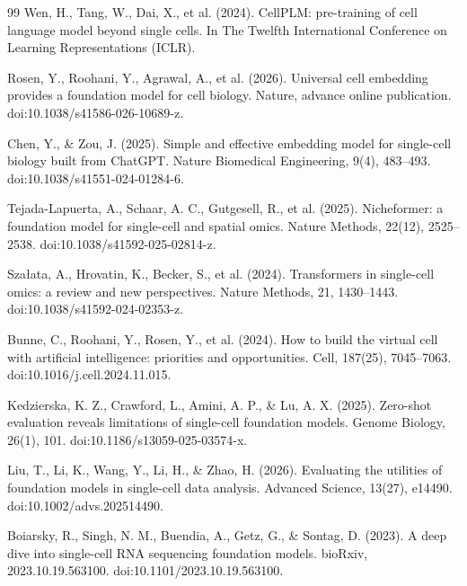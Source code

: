 \documentclass[11pt,a4paper]{article}
\begin{document}
\begin{thebibliography}{99}
Wen, H., Tang, W., Dai, X., et al. (2024).
\newblock CellPLM: pre-training of cell language model beyond single cells.
\newblock In The Twelfth International Conference on Learning Representations (ICLR).

Rosen, Y., Roohani, Y., Agrawal, A., et al. (2026).
\newblock Universal cell embedding provides a foundation model for cell biology.
\newblock Nature, advance online publication. doi:10.1038/s41586-026-10689-z.

Chen, Y., \& Zou, J. (2025).
\newblock Simple and effective embedding model for single-cell biology built from ChatGPT.
\newblock Nature Biomedical Engineering, 9(4), 483--493. doi:10.1038/s41551-024-01284-6.

Tejada-Lapuerta, A., Schaar, A. C., Gutgesell, R., et al. (2025).
\newblock Nicheformer: a foundation model for single-cell and spatial omics.
\newblock Nature Methods, 22(12), 2525--2538. doi:10.1038/s41592-025-02814-z.

Sza{\l}ata, A., Hrovatin, K., Becker, S., et al. (2024).
\newblock Transformers in single-cell omics: a review and new perspectives.
\newblock Nature Methods, 21, 1430--1443. doi:10.1038/s41592-024-02353-z.

Bunne, C., Roohani, Y., Rosen, Y., et al. (2024).
\newblock How to build the virtual cell with artificial intelligence: priorities and opportunities.
\newblock Cell, 187(25), 7045--7063. doi:10.1016/j.cell.2024.11.015.

Kedzierska, K. Z., Crawford, L., Amini, A. P., \& Lu, A. X. (2025).
\newblock Zero-shot evaluation reveals limitations of single-cell foundation models.
\newblock Genome Biology, 26(1), 101. doi:10.1186/s13059-025-03574-x.

Liu, T., Li, K., Wang, Y., Li, H., \& Zhao, H. (2026).
\newblock Evaluating the utilities of foundation models in single-cell data analysis.
\newblock Advanced Science, 13(27), e14490. doi:10.1002/advs.202514490.

Boiarsky, R., Singh, N. M., Buendia, A., Getz, G., \& Sontag, D. (2023).
\newblock A deep dive into single-cell RNA sequencing foundation models.
\newblock bioRxiv, 2023.10.19.563100. doi:10.1101/2023.10.19.563100.


\end{thebibliography}
\end{document}
